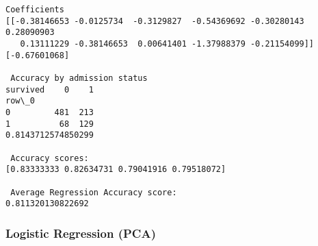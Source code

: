\documentclass[11pt]{article}
\begin{document}
    \begin{Verbatim}[commandchars=\\\{\}]
Coefficients
[[-0.38146653 -0.0125734  -0.3129827  -0.54369692 -0.30280143  0.28090903
   0.13111229 -0.38146653  0.00641401 -1.37988379 -0.21154099]]
[-0.67601068]

 Accuracy by admission status
survived    0    1
row\_0             
0         481  213
1          68  129
0.8143712574850299

 Accuracy scores:
[0.83333333 0.82634731 0.79041916 0.79518072]

 Average Regression Accuracy score:
0.811320130822692

    \end{Verbatim}

    \subsubsection{Logistic Regression (PCA)}\label{logistic-regression-pca}
\end{document}
